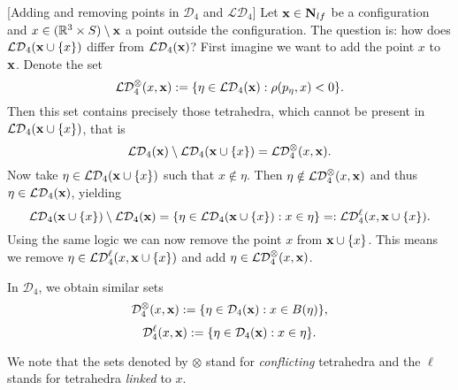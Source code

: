 


\begin{remark}\label{r:addremove}[Adding and removing points in $\mathcal D_4$ and $\mathcal {LD}_4$]
	Let ${\mathbf{x}}\in \mathbf N_{lf}$ be a configuration and $x\in({\mathbb R^3} \times S) \setminus {\mathbf{x}}$ a point outside the configuration. The question is: how does $\mathcal {LD}_4({\mathbf{x}} \cup \{x\})$ differ from $\mathcal {LD}_4({\mathbf{x}})$?
	First imagine we want to add the point $x$ to ${\mathbf{x}}$. Denote the set 
	$$\mathcal {LD}_4^\otimes(x,{\mathbf{x}}) := \{\eta \in \mathcal {LD}_4({\mathbf{x}}): \rho(p_\eta,x) < 0\}.$$
	Then this set contains precisely those tetrahedra, which cannot be present in $\mathcal {LD}_4({\mathbf{x}} \cup \{x\})$, that is
	$$ \mathcal {LD}_4 ({\mathbf{x}}) \setminus \mathcal {LD}_4({\mathbf{x}} \cup \{x\}) = \mathcal {LD}_4^\otimes(x,{\mathbf{x}}).$$
	Now take $\eta \in \mathcal {LD}_4({\mathbf{x}} \cup \{x\})$ such that $x \notin \eta$. Then $\eta \notin \mathcal {LD}_4^\otimes(x,{\mathbf{x}})$ and thus $\eta \in \mathcal {LD}_4({\mathbf{x}})$, yielding
	$$\mathcal {LD}_4 ({\mathbf{x}} \cup \{x\}) \setminus \mathcal {LD}_4({\mathbf{x}}) = \{ \eta \in \mathcal {LD}_4({\mathbf{x}}\cup\{x\}): x \in \eta\} =: \mathcal {LD}_4^\ell(x, {\mathbf{x}} \cup \{x\}).$$
	Using the same logic we can now remove the point $x$ from ${\mathbf{x}} \cup \{x\}$. This means we remove $\eta \in \mathcal {LD}_4^\ell(x,{\mathbf{x}}\cup\{x\})$ and add $\eta \in \mathcal {LD}_4^\otimes(x,{\mathbf{x}})$.\newline

	\noindent In $\mathcal D_4$, we obtain similar sets
	$$\mathcal D_4^\otimes(x,{\mathbf{x}}) := \{\eta \in \mathcal D_4({\mathbf{x}}): x \in B(\eta)\},$$
	$$\mathcal D_4^\ell(x,{\mathbf{x}}) := \{\eta \in \mathcal D_4({\mathbf{x}}): x\in \eta \}.$$

	We note that the sets denoted by $\otimes$ stand for \textit{conflicting} tetrahedra and the $\ell$ stands for tetrahedra \textit{linked} to $x$. 

\end{remark}
